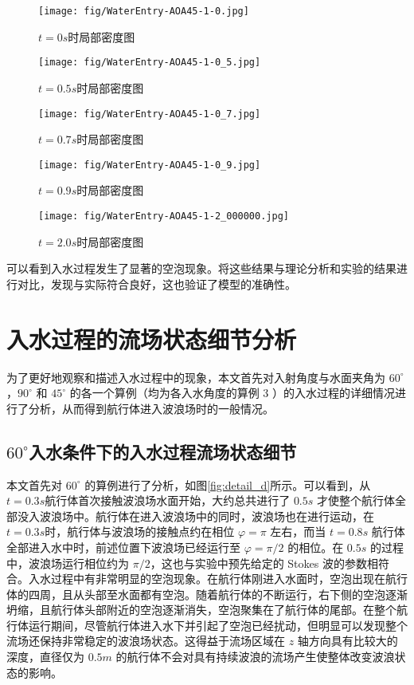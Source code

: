 \begin{figure}[!htp]
  \centering
  \texttt{[image: fig/WaterEntry-AOA45-1-0.jpg]}
  \caption{$t=0s$时局部密度图} 
\end{figure}

\begin{figure}[!htp]
  \centering
  \texttt{[image: fig/WaterEntry-AOA45-1-0\_5.jpg]}
  \caption{$t=0.5s$时局部密度图}
\end{figure}

\begin{figure}[!htp]
  \centering
  \texttt{[image: fig/WaterEntry-AOA45-1-0\_7.jpg]}
  \caption*{$t=0.7s$时局部密度图} 
\end{figure}

\begin{figure}[!htp]
  \centering
  \texttt{[image: fig/WaterEntry-AOA45-1-0\_9.jpg]}
  \caption{$t=0.9s$时局部密度图} 
\end{figure}

\begin{figure}[!htp]
  \centering
  \texttt{[image: fig/WaterEntry-AOA45-1-2\_000000.jpg]}
  \caption{$t=2.0s$时局部密度图} 
\end{figure}

可以看到入水过程发生了显著的空泡现象。将这些结果与理论分析和实验的结果进行对比，发现与实际符合良好，这也验证了模型的准确性。

\section{入水过程的流场状态细节分析}

为了更好地观察和描述入水过程中的现象，本文首先对入射角度与水面夹角为 $60^\circ$，$90 ^\circ$ 和 $45 ^\circ$ 的各一个算例（均为各入水角度的算例 3 ）的入水过程的详细情况进行了分析，从而得到航行体进入波浪场时的一般情况。

\subsection{$60 ^\circ$入水条件下的入水过程流场状态细节}

本文首先对 $60 ^\circ$ 的算例进行了分析，如图\ref{fig:detail_d}所示。可以看到，从 $t = 0.3 s$航行体首次接触波浪场水面开始，大约总共进行了 $0.5 s$ 才使整个航行体全部没入波浪场中。航行体在进入波浪场中的同时，波浪场也在进行运动，在 $t= 0.3s$时，航行体与波浪场的接触点约在相位 $\varphi = \pi$ 左右，而当 $t = 0.8s$ 航行体全部进入水中时，前述位置下波浪场已经运行至 $\varphi = \pi / 2$ 的相位。在 $0.5s$ 的过程中，波浪场运行相位约为 $\pi / 2$，这也与实验中预先给定的 Stokes 波的参数相符合。入水过程中有非常明显的空泡现象。在航行体刚进入水面时，空泡出现在航行体的四周，且从头部至水面都有空泡。随着航行体的不断运行，右下侧的空泡逐渐坍缩，且航行体头部附近的空泡逐渐消失，空泡聚集在了航行体的尾部。在整个航行体运行期间，尽管航行体进入水下并引起了空泡已经扰动，但明显可以发现整个流场还保持非常稳定的波浪场状态。这得益于流场区域在 $z$ 轴方向具有比较大的深度，直径仅为 $0.5m$ 的航行体不会对具有持续波浪的流场产生使整体改变波浪状态的影响。

